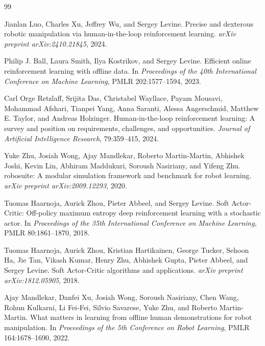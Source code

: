 \begin{thebibliography}{99}

Jianlan Luo, Charles Xu, Jeffrey Wu, and Sergey Levine.
\newblock Precise and dexterous robotic manipulation via human-in-the-loop reinforcement learning.
\newblock \emph{arXiv preprint arXiv:2410.21845}, 2024.

Philip J. Ball, Laura Smith, Ilya Kostrikov, and Sergey Levine.
\newblock Efficient online reinforcement learning with offline data.
\newblock In \emph{Proceedings of the 40th International Conference on Machine Learning}, PMLR 202:1577--1594, 2023.

Carl Orge Retzlaff, Srijita Das, Christabel Wayllace, Payam Mousavi, Mohammad Afshari, Tianpei Yang, Anna Saranti, Alessa Angerschmid, Matthew E. Taylor, and Andreas Holzinger.
\newblock Human-in-the-loop reinforcement learning: A survey and position on requirements, challenges, and opportunities.
\newblock \emph{Journal of Artificial Intelligence Research}, 79:359--415, 2024.

Yuke Zhu, Josiah Wong, Ajay Mandlekar, Roberto Martin-Martin, Abhishek Joshi, Kevin Lin, Abhiram Maddukuri, Soroush Nasiriany, and Yifeng Zhu.
\newblock robosuite: A modular simulation framework and benchmark for robot learning.
\newblock \emph{arXiv preprint arXiv:2009.12293}, 2020.

Tuomas Haarnoja, Aurick Zhou, Pieter Abbeel, and Sergey Levine.
\newblock Soft Actor-Critic: Off-policy maximum entropy deep reinforcement learning with a stochastic actor.
\newblock In \emph{Proceedings of the 35th International Conference on Machine Learning}, PMLR 80:1861--1870, 2018.

Tuomas Haarnoja, Aurick Zhou, Kristian Hartikainen, George Tucker, Sehoon Ha, Jie Tan, Vikash Kumar, Henry Zhu, Abhishek Gupta, Pieter Abbeel, and Sergey Levine.
\newblock Soft Actor-Critic algorithms and applications.
\newblock \emph{arXiv preprint arXiv:1812.05905}, 2018.

Ajay Mandlekar, Danfei Xu, Josiah Wong, Soroush Nasiriany, Chen Wang, Rohun Kulkarni, Li Fei-Fei, Silvio Savarese, Yuke Zhu, and Roberto Martin-Martin.
\newblock What matters in learning from offline human demonstrations for robot manipulation.
\newblock In \emph{Proceedings of the 5th Conference on Robot Learning}, PMLR 164:1678--1690, 2022.


\end{thebibliography}
